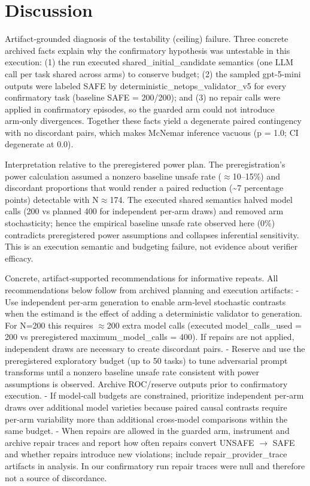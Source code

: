 \documentclass[conference]{IEEEtran}
\begin{document}
\section{Discussion}
Artifact‑grounded diagnosis of the testability (ceiling) failure. Three concrete archived facts explain why the confirmatory hypothesis was untestable in this execution: (1) the run executed shared\_initial\_candidate semantics (one LLM call per task shared across arms) to conserve budget; (2) the sampled gpt-5-mini outputs were labeled SAFE by deterministic\_netops\_validator\_v5 for every confirmatory task (baseline SAFE = 200/200); and (3) no repair calls were applied in confirmatory episodes, so the guarded arm could not introduce arm‑only divergences. Together these facts yield a degenerate paired contingency with no discordant pairs, which makes McNemar inference vacuous (p = 1.0; CI degenerate at 0.0).

Interpretation relative to the preregistered power plan. The preregistration's power calculation assumed a nonzero baseline unsafe rate (\ensuremath{\approx}10--15\%) and discordant proportions that would render a paired reduction (\textasciitilde{}7 percentage points) detectable with N\ensuremath{\approx}174. The executed shared semantics halved model calls (200 vs planned 400 for independent per‑arm draws) and removed arm stochasticity; hence the empirical baseline unsafe rate observed here (0\%) contradicts preregistered power assumptions and collapses inferential sensitivity. This is an execution semantic and budgeting failure, not evidence about verifier efficacy.

Concrete, artifact‑supported recommendations for informative repeats. All recommendations below follow from archived planning and execution artifacts:
- Use independent per‑arm generation to enable arm‑level stochastic contrasts when the estimand is the effect of adding a deterministic validator to generation. For N=200 this requires \ensuremath{\approx}200 extra model calls (executed model\_calls\_used = 200 vs preregistered maximum\_model\_calls = 400). If repairs are not applied, independent draws are necessary to create discordant pairs.
- Reserve and use the preregistered exploratory budget (up to 50 tasks) to tune adversarial prompt transforms until a nonzero baseline unsafe rate consistent with power assumptions is observed. Archive ROC/reserve outputs prior to confirmatory execution.
- If model‑call budgets are constrained, prioritize independent per‑arm draws over additional model varieties because paired causal contrasts require per‑arm variability more than additional cross‑model comparisons within the same budget.
- When repairs are allowed in the guarded arm, instrument and archive repair traces and report how often repairs convert UNSAFE \ensuremath{\rightarrow} SAFE and whether repairs introduce new violations; include repair\_provider\_trace artifacts in analysis. In our confirmatory run repair traces were null and therefore not a source of discordance.
\end{document}
